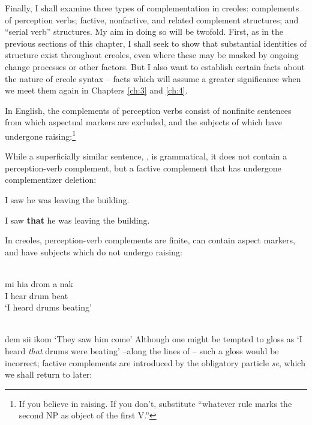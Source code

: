 Finally, I shall examine three types of complementation in creoles: complements of perception verbs; factive, nonfactive, and related complement structures; and ``serial verb'' structures. My aim in doing so will be twofold. First, as in the previous sections of this chapter, I shall seek to show that substantial identities of structure exist throughout creoles, even where these may be masked by ongoing change processes or other factors. But I also want to establish certain facts about the nature of creole syntax -- facts which will assume a greater significance when we meet them again in Chapters \ref{ch:3} and \ref{ch:4}.

In English, the complements of perception verbs consist of nonfinite sentences from which aspectual markers are excluded, and the subjects of which have undergone raising:\footnote{If you believe in raising. If you don't, substitute ``whatever rule marks the second NP as object of the first V.''}

\z

\z

\z

\z

\z
While a superficially similar sentence, , is grammatical, it does not contain a perception-verb complement, but a factive complement that has undergone complementizer deletion:

\ea\label{ex:2:130}I saw he was leaving the building.\z

\ea\label{ex:2:131}I saw \textbf{that} he was leaving the building.\z{}

In creoles, perception-verb complements are finite, can contain aspect markers, and have subjects which do not undergo raising:

\ea\label{ex:2:132}
\\
\gll mi hia drom a nak\\
I hear drum {\ASP} beat\\
\glt `I heard drums beating'
\z

\ea\label{ex:2:133}
\\
dem sii ikom
\glt `They saw him come'
\z
Although one might be tempted to gloss  as `I heard \textit{that} drums were beating' --along the lines of  -- such a gloss would be incorrect; factive complements are introduced by the obligatory particle \textit{se}, which we shall return to later:

